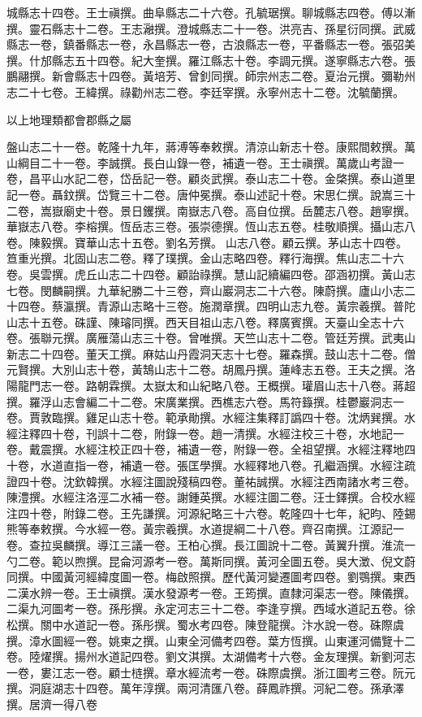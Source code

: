 \begin{pinyinscope}
城縣志十四卷。王士禛撰。曲阜縣志二十六卷。孔毓琚撰。聊城縣志四卷。傅以漸撰。靈石縣志十二卷。王志瀜撰。澄城縣志二十一卷。洪亮吉、孫星衍同撰。武威縣志一卷，鎮番縣志一卷，永昌縣志一卷，古浪縣志一卷，平番縣志一卷。張弨美撰。什邡縣志五十四卷。紀大奎撰。羅江縣志十卷。李調元撰。遂寧縣志六卷。張鵬翮撰。新會縣志十四卷。黃培芳、曾釗同撰。師宗州志二卷。夏治元撰。彌勒州志二十七卷。王緯撰。祿勸州志二卷。李廷宰撰。永寧州志十二卷。沈毓蘭撰。

以上地理類都會郡縣之屬

盤山志二十一卷。乾隆十九年，蔣溥等奉敕撰。清涼山新志十卷。康熙間敕撰。萬山綱目二十一卷。李誠撰。長白山錄一卷，補遺一卷。王士禛撰。萬歲山考證一卷，昌平山水記二卷，岱岳記一卷。顧炎武撰。泰山志二十卷。金棨撰。泰山道里記一卷。聶鈫撰。岱覽三十二卷。唐仲冕撰。泰山述記十卷。宋思仁撰。說嵩三十二卷，嵩嶽廟史十卷。景日钁撰。南嶽志八卷。高自位撰。岳麓志八卷。趙寧撰。華嶽志八卷。李榕撰。恆岳志三卷。張崇德撰。恆山志五卷。桂敬順撰。攝山志八卷。陳毅撰。寶華山志十五卷。劉名芳撰。山志八卷。顧云撰。茅山志十四卷。笪重光撰。北固山志二卷。釋了璞撰。金山志略四卷。釋行海撰。焦山志二十六卷。吳雲撰。虎丘山志二十四卷。顧詒祿撰。慧山記續編四卷。邵涵初撰。黃山志七卷。閔麟嗣撰。九華紀勝二十三卷，齊山巖洞志二十六卷。陳蔚撰。廬山小志二十四卷。蔡瀛撰。青源山志略十三卷。施潤章撰。四明山志九卷。黃宗羲撰。普陀山志十五卷。硃謹、陳璿同撰。西天目祖山志八卷。釋廣賓撰。天臺山全志十六卷。張聯元撰。廣雁蕩山志三十卷。曾唯撰。天竺山志十二卷。管廷芳撰。武夷山新志二十四卷。董天工撰。麻姑山丹霞洞天志十七卷。羅森撰。鼓山志十二卷。僧元賢撰。大別山志十卷，黃鵠山志十二卷。胡鳳丹撰。蓮峰志五卷。王夫之撰。洛陽龍門志一卷。路朝霖撰。太嶽太和山紀略八卷。王概撰。瓘眉山志十八卷。蔣超撰。羅浮山志會編二十二卷。宋廣業撰。西樵志六卷。馬符籙撰。桂鬱巖洞志一卷。賈敦臨撰。雞足山志十卷。範承勛撰。水經注集釋訂譌四十卷。沈炳巽撰。水經注釋四十卷，刊誤十二卷，附錄一卷。趙一清撰。水經注校三十卷，水地記一卷。戴震撰。水經注校正四十卷，補遺一卷，附錄一卷。全祖望撰。水經注釋地四十卷，水道直指一卷，補遺一卷。張匡學撰。水經釋地八卷。孔繼涵撰。水經注疏證四十卷。沈欽韓撰。水經注圖說殘稿四卷。董祐誠撰。水經注西南諸水考三卷。陳澧撰。水經注洛涇二水補一卷。謝鍾英撰。水經注圖二卷。汪士鐸撰。合校水經注四十卷，附錄二卷。王先謙撰。河源紀略三十六卷。乾隆四十七年，紀昀、陸錫熊等奉敕撰。今水經一卷。黃宗羲撰。水道提綱二十八卷。齊召南撰。江源記一卷。查拉吳麟撰。導江三議一卷。王柏心撰。長江圖說十二卷。黃翼升撰。淮流一勺二卷。範以煦撰。昆侖河源考一卷。萬斯同撰。黃河全圖五卷。吳大澂、倪文蔚同撰。中國黃河經緯度圖一卷。梅啟照撰。歷代黃河變遷圖考四卷。劉鶚撰。東西二漢水辨一卷。王士禛撰。漢水發源考一卷。王筠撰。直隸河渠志一卷。陳儀撰。二渠九河圖考一卷。孫彤撰。永定河志三十二卷。李逢亨撰。西域水道記五卷。徐松撰。關中水道記一卷。孫彤撰。蜀水考四卷。陳登龍撰。汴水說一卷。硃際虞撰。漳水圖經一卷。姚柬之撰。山東全河備考四卷。葉方恆撰。山東運河備覽十二卷。陸燿撰。揚州水道記四卷。劉文淇撰。太湖備考十六卷。金友理撰。新劉河志一卷，婁江志一卷。顧士梿撰。章水經流考一卷。硃際虞撰。浙江圖考三卷。阮元撰。洞庭湖志十四卷。萬年淳撰。兩河清匯八卷。薛鳳祚撰。河紀二卷。孫承澤撰。居濟一得八卷
\end{pinyinscope}

